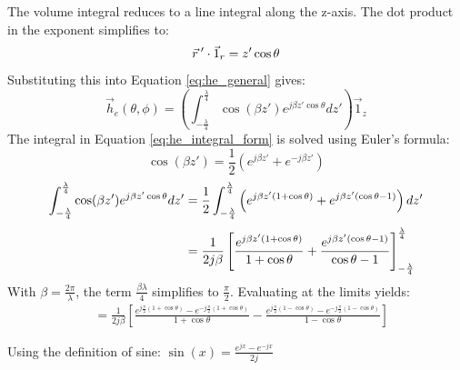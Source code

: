 The volume integral reduces to a line integral along the z-axis. The dot product in the exponent simplifies to:
\begin{equation}
    \vec{r}\hspace{0.2em}' \cdot \vec{1}_r = z' \cos\theta
\end{equation}
\vspace{0.5em}
Substituting this into Equation \ref{eq:he_general} gives:
\begin{equation}
    \vec{h}_e(\theta, \phi) = \left( \int_{-\frac{\lambda}{4}}^{\frac{\lambda}{4}} \cos(\beta z') e^{j\beta z' \cos\theta} dz' \right) \vec{1}_z
    \label{eq:he_integral_form}
\end{equation}
\vspace{0.5em}
The integral in Equation \ref{eq:he_integral_form} is solved using Euler's formula:
\begin{equation}
    \cos(\beta z') = \frac{1}{2}(e^{j\beta z'} + e^{-j\beta z'})
\end{equation}
\begin{align}
    \int_{-\frac{\lambda}{4}}^{\frac{\lambda}{4}} \cos(\beta z') e^{j\beta z' \cos\theta} dz' &= \frac{1}{2} \int_{-\frac{\lambda}{4}}^{\frac{\lambda}{4}} \left( e^{j\beta z'(1+\cos\theta)} + e^{j\beta z'(\cos\theta-1)} \right) dz' \\[\jot]
    &= \frac{1}{2j\beta} \left[ \frac{e^{j\beta z'(1+\cos\theta)}}{1+\cos\theta} + \frac{e^{j\beta z'(\cos\theta-1)}}{\cos\theta-1} \right]_{-\frac{\lambda}{4}}^{\frac{\lambda}{4}}
\end{align}
\vspace{1em}
With $\beta = \frac{2\pi}{\lambda}$, the term $\frac{\beta\lambda}{4}$ simplifies to $\frac{\pi}{2}$. Evaluating at the limits yields:
\vspace{1em}
\begin{align}
    &= \frac{1}{2j\beta} \left[ \frac{e^{j\frac{\pi}{2}(1+\cos\theta)} - e^{-j\frac{\pi}{2}(1+\cos\theta)}}{1+\cos\theta} - \frac{e^{j\frac{\pi}{2}(1-\cos\theta)} - e^{-j\frac{\pi}{2}(1-\cos\theta)}}{1-\cos\theta} \right]
\end{align}

\vspace{1em}
Using the definition of sine: $\sin(x) = \frac{e^{jx}-e^{-jx}}{2j}$

